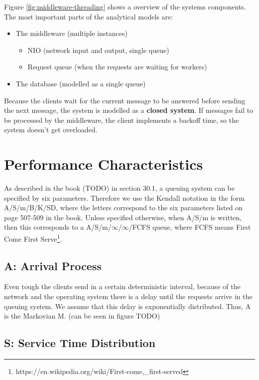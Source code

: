 \documentclass[a4paper]{article}
\begin{document}
Figure \ref{fig:middleware-threading} shows a overview of the systems components. The most important parts of the analytical models are:

\begin{itemize}
\item The middleware (multiple instances)
	\begin{itemize}
	\item NIO (network input and output, single queue)
	\item Request queue (when the requests are waiting for workers)
	\end{itemize}
\item The database (modelled as a single queue)
\end{itemize}

Because the clients wait for the current message to be answered before sending the next message, the system is modelled as a \textbf{closed system}. If messages fail to be processed by the middleware, the client implements a backoff time, so the system doesn't get overloaded.

\section{Performance Characteristics}

As described in the book (TODO) in section 30.1, a queuing system can be specified by six parameters. Therefore we use the Kendall notation in the form A/S/m/B/K/SD, where the letters correspond to the six parameters listed on page 507-509 in the book. Unless specified otherwise, when A/S/m is written, then this corresponds to a A/S/m/$\infty$/$\infty$/FCFS queue, where FCFS means First Come First Serve\footnote{https://en.wikipedia.org/wiki/First-come,\_first-served}.

\subsection{A: Arrival Process}

Even tough the clients send in a certain deterministic interval, because of the network and the operating system there is a delay until the requests arrive in the queuing system. We assume that this delay is exponentially distributed. Thus, A is the Markovian M. (can be seen in figure TODO)

\subsection{S: Service Time Distribution}
\end{document}
